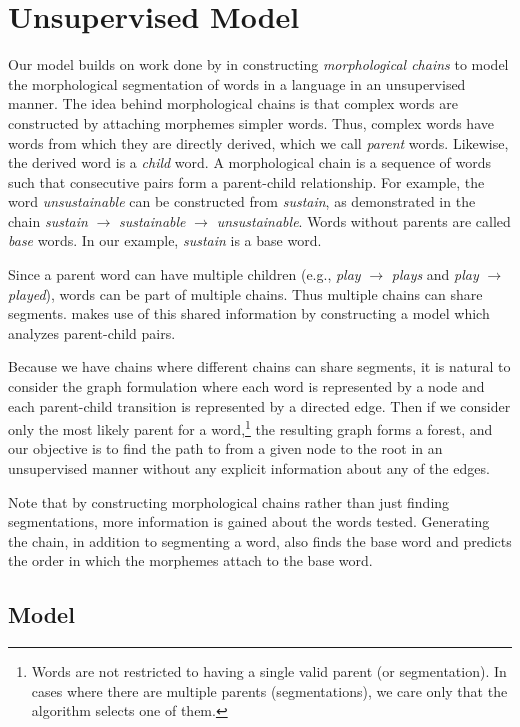 \documentclass[11pt,twocolumn]{article}
\begin{document}
\section{Unsupervised Model}
Our model builds on work done by \citet{Narasimhan15} in constructing \emph{morphological chains} to model the morphological segmentation of words in a language in an unsupervised manner. The idea behind morphological chains is that complex words are constructed by attaching morphemes simpler words. Thus, complex words have words from which they are directly derived, which we call \emph{parent} words. Likewise, the derived word is a \emph{child} word. A morphological chain is a sequence of words such that consecutive pairs form a parent-child relationship. For example, the word \emph{unsustainable} can be constructed from \emph{sustain}, as demonstrated in the chain \emph{sustain} $\rightarrow$ \emph{sustainable} $\rightarrow$ \emph{unsustainable}. Words without parents are called \emph{base} words. In our example, \emph{sustain} is a base word.

Since a parent word can have multiple children (e.g., \emph{play} $\rightarrow$ \emph{plays} and \emph{play} $\rightarrow$ \emph{played}), words can be part of multiple chains. Thus multiple chains can share segments.
\citeauthor{Narasimhan15} makes use of this shared information by constructing a model which analyzes parent-child pairs.

Because we have chains where different chains can share segments, it is natural to consider the graph formulation where each word is represented by a node and each parent-child transition is represented by a directed edge. Then if we consider only the most likely parent for a word,\footnote{Words are not restricted to having a single valid parent (or segmentation). In cases where there are multiple parents (segmentations), we care only that the algorithm selects one of them.} the resulting graph forms a forest, and our objective is to find the path to from a given node to the root in an unsupervised manner without any explicit information about any of the edges.

Note that by constructing morphological chains rather than just finding segmentations, more information is gained about the words tested. Generating the chain, in addition to segmenting a word, also finds the base word and predicts the order in which the morphemes attach to the base word.

\subsection{Model}
\end{document}
